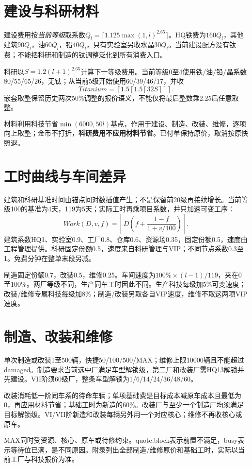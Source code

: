 \section{建设与科研材料}
建设费用按\emph{当前等级}取系数\(Q_l=\lceil1.125\max(1,l)^{2.65}\rceil\)。HQ铁费为\(160Q_l\)，其他建筑\(90Q_l\)，油\(60Q_l\)，铅\(40Q_l\)，只有实验室另收水晶\(30Q_l\)。当前建设配方没有钛费；不能把科研和制造的钛调整泛化到所有消费入口。

科研以\(S=1.2(l+1)^{2.65}\)计算下一等级费用。当前等级0至4使用铁/油/铅/晶系数80/55/65/26，无钛；从当前5级开始使用60/39/46/17，并收
\[
Titanium=\left\lceil1.5\left\lceil1.5\left\lceil32S\right\rceil\right\rceil\right\rceil.
\]
嵌套取整保留历史两次50\%调整的报价语义，不能仅将最后整数乘2.25后任意取整。

材料利用科技节省\(\min(6000,50l)\)基点，作用于建设、制造、改装、维修，逐项向上取整；金币不打折，\textbf{科研费用不应用材料节省}。已付单保持原价，取消按原快照退。

\section{工时曲线与车间差异}
建筑和科研基准时间由锚点间对数插值产生；不是保留前20级再接续增长。当前等级100的基准为4天，119为5天；实际工时再乘项目系数，并只加速可变工序：
\[
Work(D,v,f)=\left\lceil D\left(f+\frac{1-f}{1+v/100}\right)\right\rceil.
\]
建筑系数HQ1、实验室0.9、工厂0.8、仓库0.6、资源场0.35，固定份额0.5，速度由工程管理提供。科研固定份额0.5，速度来自科研管理与VIP；不同节点系数0.3至1。免费分钟在整单末段另减。

制造固定份额0.7，改装0.5，维修0.25。车间速度为\(100\%\times(l-1)/119\)，夹在0至100\%。两厂等级不同，生产同车工时因此不同。生产科技每级加5\%可变速度；改装/维修专属科技每级加8\%；制造/改装另取各自VIP速度，维修不取这两项VIP速度。

\section{制造、改装和维修}
单次制造或改装1至500辆，快捷50/100/500/MAX；维修上限10000辆且不能超过damaged。制造要求当前选中厂满足车型解锁级，第二厂和改装厂需HQ13解锁并先建设。VII阶须60级厂，整条车型解锁为1/6/14/24/36/48/60。

改装消耗低一阶同车系的待命车辆；单项基础费是目标成本减原车成本且最低为0，再应用材料节省；基础工时为新造的60\%。改装厂与至少一个制造厂均须满足目标解锁级。VI/VII阶新造和改装每辆另外用一个对应核心；维修不再收核心或原车。

MAX同时受资源、核心、原车或待修约束。quote.block表示前置不满足，busy表示等待位已满，是不同原因。附录列出全部制造/维修原价和基础工时，实际以当前工厂与科技报价为准。
